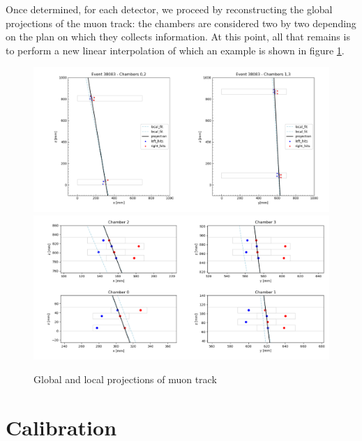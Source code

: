 \documentclass[a4paper,11pt]{book}
\begin{document}
Once determined, for each detector, we proceed by reconstructing the global projections of the muon track: the chambers are considered two by two depending on the plan on which they collects information. At this point, all that remains is to perform a new linear interpolation 
of which an example is shown in figure \ref{fig:glob_proj_ex}.\\

\begin{figure}[hbtp]
\centering
\includegraphics[scale=0.4]{pictures/example_track2D.pdf}
\includegraphics[scale=0.4]{pictures/example_track2D_dets.pdf}
\caption{Global and local projections of muon track}
\label{fig:glob_proj_ex}
\end{figure}


\section{Calibration}
\end{document}
